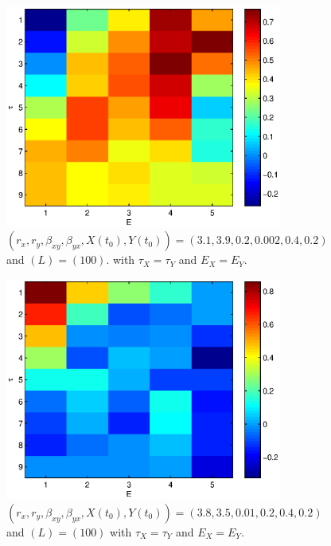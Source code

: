 \documentclass[a4paper,11pt]{article}
\begin{document}
\begin{figure}[h!t]
\centering
\begin{subfigure}[b]{0.4\textwidth}
\label{fig:SugEx2vEdimvTau}
\includegraphics[scale=0.55]{SugEx2vEdimvTau.eps}
\caption{ $\left(r_x,r_y,\beta_{xy},\beta_{yx},X(t_0),Y(t_0)\right) = \left(3.1,3.9,0.2,0.002,0.4,0.2\right)$ and $\left(L\right) = \left(100\right)$. with $\tau_X=\tau_Y$ and $E_X=E_Y$.}
\end{subfigure}
\begin{subfigure}[b]{0.4\textwidth}
\label{fig:SugEx1vEdimvTau}
\includegraphics[scale=0.55]{SugEx1vEdimvTau.eps}
\caption{ $\left(r_x,r_y,\beta_{xy},\beta_{yx},X(t_0),Y(t_0)\right) = \left(3.8,3.5,0.01,0.2,0.4,0.2\right)$ and $\left(L\right) = \left(100\right)$ with $\tau_X=\tau_Y$ and $E_X=E_Y$.}
\end{subfigure}
\caption{}
\end{figure}
\end{document}
